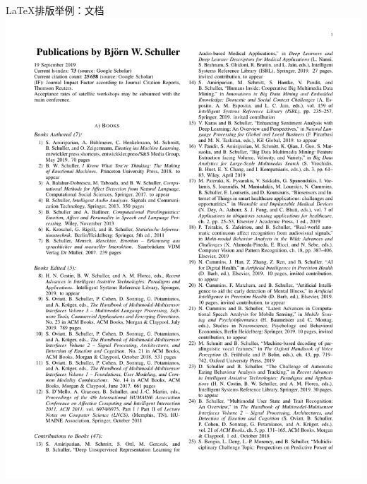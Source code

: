 \documentclass[UTF8,11pt]{ctexbeamer}
\begin{document}
\begin{frame}{\LaTeX 排版举例：文档}
	\includegraphics[scale=0.25]{figure/bib}

\end{frame}
\end{document}
